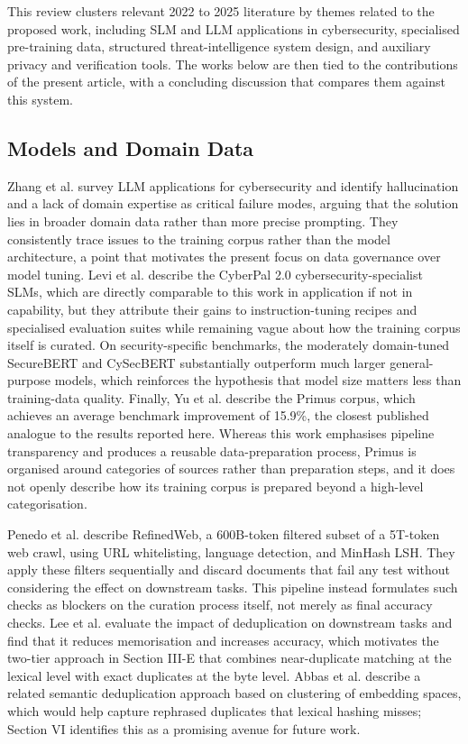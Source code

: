 \documentclass[conference]{IEEEtran}
\begin{document}
This review clusters relevant 2022 to 2025 literature by
themes related to the proposed work, including SLM and LLM
applications in cybersecurity, specialised pre-training data,
structured threat-intelligence system design, and auxiliary
privacy and verification tools. The works below are then tied to
the contributions of the present article, with a concluding
discussion that compares them against this system.

\subsection{Models and Domain Data}
Zhang et al.\cite{zhang2025llms} survey LLM applications for cybersecurity and identify hallucination and a lack of domain expertise as critical failure modes, arguing that the solution lies in broader domain data rather than more precise prompting. They consistently trace issues to the training corpus rather than the model architecture, a point that motivates the present focus on data governance over model tuning. Levi et al. \cite{levi2025cyberpal} describe the CyberPal 2.0 cybersecurity-specialist SLMs, which are directly comparable to this work in application if not in capability, but they attribute their gains to instruction-tuning recipes and specialised evaluation suites while remaining vague about how the training corpus itself is curated. On security-specific benchmarks, the moderately domain-tuned SecureBERT \cite{aghaei2022securebert} and CySecBERT \cite{bayer2024cysecbert} substantially outperform much larger general-purpose models, which reinforces the hypothesis that model size matters less than training-data quality. Finally, Yu et al. \cite{yu2025primus} describe the Primus corpus, which achieves an average benchmark improvement of 15.9\%, the closest published analogue to the results reported here. Whereas this work emphasises pipeline transparency and produces a reusable data-preparation process, Primus is organised around categories of sources rather than preparation steps, and it does not openly describe how its training corpus is prepared beyond a high-level categorisation.

Penedo et al. \cite{penedo2023refinedweb} describe RefinedWeb, a 600B-token filtered subset of a 5T-token web crawl, using URL whitelisting, language detection, and MinHash LSH. They apply these filters sequentially and discard documents that fail any test without considering the effect on downstream tasks. This pipeline instead formulates such checks as blockers on the curation process itself, not merely as final accuracy checks. Lee et al. \cite{lee2022deduplication} evaluate the impact of deduplication on downstream tasks and find that it reduces memorisation and increases accuracy, which motivates the two-tier approach in Section III-E that combines near-duplicate matching at the lexical level with exact duplicates at the byte level. Abbas et al. \cite{abbas2023semdedup} describe a related semantic deduplication approach based on clustering of embedding spaces, which would help capture rephrased duplicates that lexical hashing misses; Section VI identifies this as a promising avenue for future work.
\end{document}

